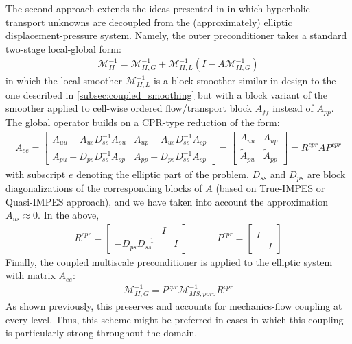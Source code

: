 The second approach extends the ideas presented in \cite{Klevtsov2016} in which hyperbolic transport unknowns are decoupled from the (approximately) elliptic displacement-pressure system.
Namely, the outer preconditioner takes a standard two-stage local-global form:
\begin{align}
    \mathcal{M}_{II}^{-1} = \mathcal{M}_{II,G}^{-1} + \mathcal{M}_{II,L}^{-1}\left(I - A \mathcal{M}_{II,G}^{-1}\right)
\end{align}
in which the local smoother $\mathcal{M}_{II,L}^{-1}$ is a block smoother similar in design to the one described in \autoref{subsec:coupled_smoothing} but with a block variant of the smoother applied to cell-wise ordered flow/transport block $A_{ff}$ instead of $A_{pp}$.   The global operator builds on a CPR-type reduction of the form:
\begin{align}
    A_{ee} =
    \begin{bmatrix}
        A_{uu} - A_{us} D_{ss}^{-1} A_{su} & A_{up} - A_{us} D_{ss}^{-1} A_{sp} \\
        A_{pu} - D_{ps} D_{ss}^{-1} A_{sp} & A_{pp} - D_{ps} D_{ss}^{-1} A_{sp}
    \end{bmatrix}
    =
    \begin{bmatrix}
        A_{uu}         & A_{up} \\
        \tilde{A}_{pu} & \tilde{A}_{pp}
    \end{bmatrix}
    = R^{cpr} A P^{cpr}
\end{align}
with subscript $e$ denoting the elliptic part of the problem, $D_{ss}$ and $D_{ps}$ are block diagonalizations of the corresponding blocks of $A$ (based on True-IMPES or Quasi-IMPES approach), and we have taken into account the approximation $A_{us} \approx 0$.   In the above,
\begin{align}
    R^{cpr} = 
    \begin{bmatrix}
                             & I &   \\
        - D_{ps} D_{ss}^{-1} &   & I
    \end{bmatrix}
    \quad\quad\quad
    P^{cpr} =
    \begin{bmatrix}
          &   \\
        I &   \\
          & I 
    \end{bmatrix}
\end{align}
Finally, the coupled multiscale preconditioner is applied to the elliptic system with matrix $A_{ee}$:
\begin{align}
    \mathcal{M}_{II,G}^{-1} = P^{cpr} \mathcal{M}_{MS,poro}^{-1} R^{cpr}
\end{align}
As shown previously, this preserves and accounts for mechanics-flow coupling at every level.   Thus, this scheme might be preferred in cases in which this coupling is particularly strong throughout the domain.

